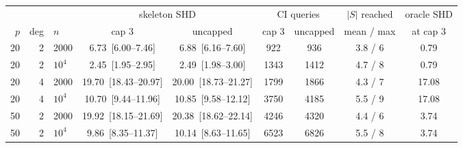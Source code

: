 \begin{tabular}{rrlcccccc}
\toprule
& & & \multicolumn{2}{c}{skeleton SHD} & \multicolumn{2}{c}{CI queries} & $|S|$ reached & oracle SHD \\
\cmidrule(lr){4-5}\cmidrule(lr){6-7}
$p$ & deg & $n$ & cap $3$ & uncapped & cap $3$ & uncapped & mean / max & at cap $3$ \\
\midrule
20 & 2 & 2000 & 6.73~[6.00--7.46] & 6.88~[6.16--7.60] & 922 & 936 & 3.8 / 6 & 0.79 \\
20 & 2 & $10^4$ & 2.45~[1.95--2.95] & 2.49~[1.98--3.00] & 1343 & 1412 & 4.7 / 8 & 0.79 \\
20 & 4 & 2000 & 19.70~[18.43--20.97] & 20.00~[18.73--21.27] & 1799 & 1866 & 4.3 / 7 & 17.08 \\
20 & 4 & $10^4$ & 10.70~[9.44--11.96] & 10.85~[9.58--12.12] & 3750 & 4185 & 5.5 / 9 & 17.08 \\
50 & 2 & 2000 & 19.92~[18.15--21.69] & 20.38~[18.62--22.14] & 4246 & 4320 & 4.4 / 6 & 3.74 \\
50 & 2 & $10^4$ & 9.86~[8.35--11.37] & 10.14~[8.63--11.65] & 6523 & 6826 & 5.5 / 8 & 3.74 \\
\bottomrule
\end{tabular}
